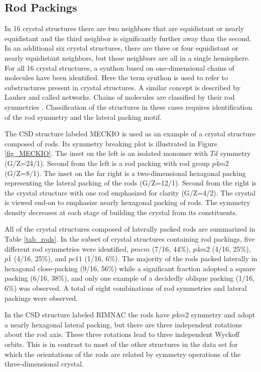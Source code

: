 \documentclass[preprint]{iucr}              %
\begin{document}
\subsection{Rod Packings}

In 16 crystal structures there are two neighbors that are equidistant or nearly equidistant and the third neighbor is significantly further away than the second.  In an additional six crystal structures, there are three or four equidistant or nearly equidistant neighbors, but these neighbors are all in a single hemisphere.  For all 16 crystal structures, a synthon based on one-dimensional chains of molecules have been identified.  Here the term synthon is used to refer to substructures present in crystal structures.  A similar concept is described by Lauher \cite{lauher04} and called networks.  Chains of molecules are classified by their rod symmetries \cite{Hahn02VolE}.  Classification of the structures in these cases requires identification of the rod symmetry and the lateral packing motif.  

The CSD structure labeled MECKIO is used as an example of a crystal structure composed of rods.  Its symmetry breaking plot is illustrated in Figure \ref{fig_MECKIO}.  The inset on the left is an isolated monomer with $Td$ symmetry (G/Z=24/1).  Second from the left is a rod packing with rod group $p\bar{4}m2$ (G/Z=8/1).  The inset on the far right is a two-dimensional hexagonal packing representing the lateral packing of the rods (G/Z=12/1).  Second from the right is the crystal structure with one rod emphasized for clarity (G/Z=4/2).  The crystal is viewed end-on to emphasize nearly hexagonal packing of rods.  The symmetry density decreases at each stage of building the crystal from its constituents.  

All of the crystal structures composed of laterally packed rods are summarized in Table \ref{tab_rods}.  In the subset of crystal structures containing rod packings, five different rod symmetries were identified, $pmcm$ (7/16, 44\%), $p\bar{4}m2$ (4/16, 25\%), $p\bar{1}$ (4/16, 25\%), and $pc11$ (1/16, 6\%).  The majority of the rods packed laterally in hexagonal close-packing (9/16, 56\%) while a significant fraction adopted a square packing (6/16, 38\%), and only one example of a decidedly oblique packing (1/16, 6\%) was observed.  A total of eight combinations of rod symmetries and lateral packings were observed.

In the CSD structure labeled RIMNAC the rods have $p\bar{4}m2$ symmetry and adopt a nearly hexagonal lateral packing, but there are three independent rotations about the rod axis.  These three rotations lead to three independent Wyckoff orbits.  This is in contrast to most of the other structures in the data set for which the orientations of the rods are related by symmetry operations of the three-dimensional crystal.
\end{document}
